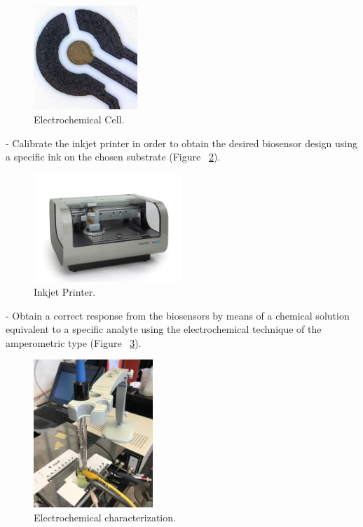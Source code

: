 \begin{figure}[H]
  \centering
    \includegraphics[width=0.35\textwidth]{Figures/Figura_celda_electroquimica}
  \caption{Electrochemical Cell.}
  \label{fig:Figura_celda_electroquimica}
\end{figure}

- Calibrate the inkjet printer in order to obtain the desired biosensor design using a specific ink on the chosen substrate (Figure ~\ref{fig:Figura_impresora_objetivos}).\\

\begin{figure}[H]
  \centering
    \includegraphics[width=0.5\textwidth]{Figures/Figura_impresora_objetivos}
  \caption{Inkjet Printer.}
  \label{fig:Figura_impresora_objetivos}
\end{figure}

- Obtain a correct response from the biosensors by means of a chemical solution equivalent to a specific analyte using the electrochemical technique of the amperometric type (Figure ~\ref{fig:Figura_caracElectroquim_objetivos}).\\

\begin{figure}[H]
  \centering
    \includegraphics[width=0.4\textwidth]{Figures/Figura_caracElectroquim_objetivos}
  \caption{Electrochemical characterization.}
  \label{fig:Figura_caracElectroquim_objetivos}
\end{figure}